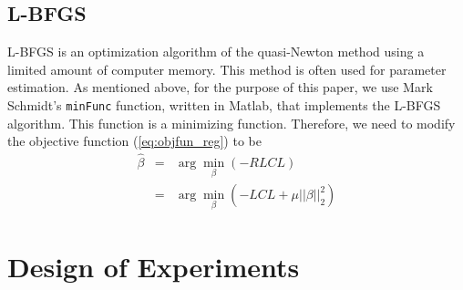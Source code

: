 \documentclass{article} %
\newcommand{\argmin}{\arg\!\min}
\begin{document}
\subsection{L-BFGS}

L-BFGS is an optimization algorithm of the quasi-Newton method using a limited amount of computer memory\cite{wiki_lbfgs}. This method is often used for parameter estimation. As mentioned above, for the purpose of this paper, we use Mark Schmidt's {\tt minFunc} function, written in Matlab, that implements the L-BFGS algorithm. This function is a minimizing function. Therefore, we need to modify the objective function (\ref{eq:objfun_reg}) to be
\begin{eqnarray} \label{eq:objfun_reg_minimize}
\hat{\beta} &=& \argmin_{\beta} (- RLCL) \nonumber \\
            &=& \argmin_{\beta} (- LCL + \mu ||\beta||_2^2)
\end{eqnarray}


\section{Design of Experiments}
\label{sec:experiments}







\end{document}
